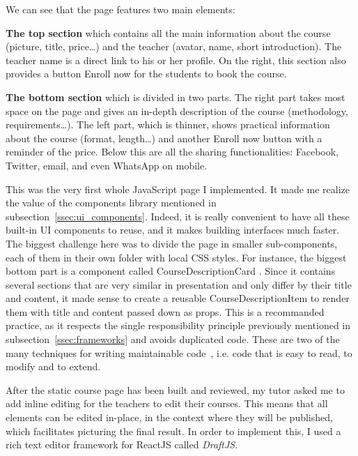 We can see that the page features two main elements:

\textbf{The top section} which contains all the main information about the course (picture, title, price\ldots) and the teacher (avatar, name, short introduction).
The teacher name is a direct link to his or her profile. On the right, this section also provides a button \guillemotleft{} Enroll now \guillemotright{} for the students
to book the course.

\textbf{The bottom section} which is divided in two parts. The right part takes most space on the page and gives an in-depth description of the course
(methodology, requirements\ldots). The left part, which is thinner, shows practical information about the course (format, length\ldots) and another
\guillemotleft{} Enroll now \guillemotright{} button with a reminder of the price. Below this are all the sharing functionalities: Facebook, Twitter,
email, and even WhatsApp on mobile.

This was the very first whole JavaScript page I implemented. It made me realize the value of the components library mentioned in {\sc subsection}~\ref{ssec:ui_components}.
Indeed, it is really convenient to have all these built-in UI components to reuse, and it makes building interfaces much faster. The biggest challenge here was to divide
the page in smaller sub-components, each of them in their own folder with local CSS styles. For instance, the biggest bottom part is a component called
\guillemotleft{} CourseDescriptionCard \guillemotright{}. Since it contains several sections that are very similar in presentation and only differ by their title and content,
it made sense to create a reusable \guillemotleft{} CourseDescriptionItem \guillemotright{} to render them with title and content passed down as props. This is a recommanded
practice, as it respects the single responsibility principle previously mentioned in {\sc subsection}~\ref{ssec:frameworks} and avoids duplicated code.
These are two of the many techniques for writing maintainable code~\cite{maintainable}, i.e. code that is easy to read, to modify and to extend.

After the static course page has been built and reviewed, my tutor asked me to add inline editing for the teachers to edit their courses.
This means that all elements can be edited in-place, in the context where they will be published, which facilitates picturing the final result.
In order to implement this, I used a rich text editor framework for ReactJS called \textit{DraftJS}.

